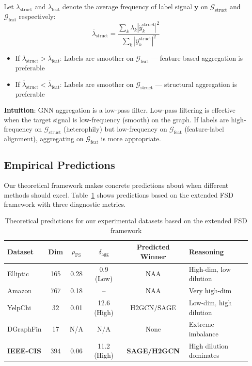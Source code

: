 \begin{proposition}
\label{prop:spectral}
Let $\lambda_{\text{struct}}$ and $\lambda_{\text{feat}}$ denote the average frequency of label signal $\mathbf{y}$ on $\mathcal{G}_{\text{struct}}$ and $\mathcal{G}_{\text{feat}}$ respectively:
\begin{equation}
\bar{\lambda}_{\text{struct}} = \frac{\sum_k \lambda_k |\hat{y}_k^{\text{struct}}|^2}{\sum_k |\hat{y}_k^{\text{struct}}|^2}
\end{equation}

\begin{itemize}
    \item If $\bar{\lambda}_{\text{struct}} > \bar{\lambda}_{\text{feat}}$: Labels are smoother on $\mathcal{G}_{\text{feat}}$ --- feature-based aggregation is preferable
    \item If $\bar{\lambda}_{\text{struct}} < \bar{\lambda}_{\text{feat}}$: Labels are smoother on $\mathcal{G}_{\text{struct}}$ --- structural aggregation is preferable
\end{itemize}
\end{proposition}

\textbf{Intuition}: GNN aggregation is a low-pass filter. Low-pass filtering is effective when the target signal is low-frequency (smooth) on the graph. If labels are high-frequency on $\mathcal{G}_{\text{struct}}$ (heterophily) but low-frequency on $\mathcal{G}_{\text{feat}}$ (feature-label alignment), aggregating on $\mathcal{G}_{\text{feat}}$ is more appropriate.

\subsection{Empirical Predictions}

Our theoretical framework makes concrete predictions about when different methods should excel. Table~\ref{tab:predictions} shows predictions based on the extended FSD framework with three diagnostic metrics.

\begin{table}[h]
\centering
\caption{Theoretical predictions for our experimental datasets based on the extended FSD framework}
\label{tab:predictions}
\small
\begin{tabular}{lccccp{2.8cm}}
\toprule
\textbf{Dataset} & \textbf{Dim} & \textbf{$\rho_{\text{FS}}$} & \textbf{$\delta_{\text{agg}}$} & \textbf{Predicted Winner} & \textbf{Reasoning} \\
\midrule
Elliptic & 165 & 0.28 & 0.9 (Low) & NAA & High-dim, low dilution \\
Amazon & 767 & 0.18 & -- & NAA & Very high-dim \\
YelpChi & 32 & 0.01 & 12.6 (High) & H2GCN/SAGE & Low-dim, high dilution \\
DGraphFin & 17 & N/A & N/A & None & Extreme imbalance \\
\midrule
\textbf{IEEE-CIS} & 394 & 0.06 & 11.2 (High) & \textbf{SAGE/H2GCN} & High dilution dominates \\
\bottomrule
\end{tabular}
\end{table}

